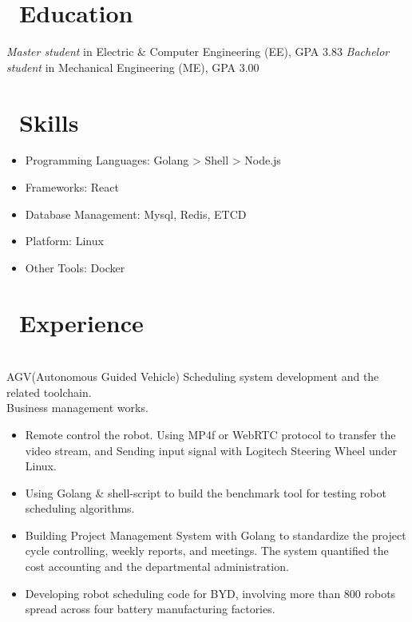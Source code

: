 \documentclass{resume}
\begin{document}



\section{\faGraduationCap\ Education}
\textit{Master student} in Electric \& Computer Engineering (EE), GPA 3.83
\textit{Bachelor student} in Mechanical Engineering (ME), GPA 3.00

\section{\faCogs\ Skills}
\begin{itemize}[parsep=0.5ex]
  \item Programming Languages: Golang > Shell > Node.js
  \item Frameworks: React
  \item Database Management: Mysql, Redis, ETCD
  \item Platform: Linux
  \item Other Tools: Docker
\end{itemize}

\section{\faUsers\ Experience}
\role{Software engineer}
\\AGV(Autonomous Guided Vehicle) Scheduling system development and the related toolchain.
\\Business management works.
\begin{itemize}
  \item Remote control the robot. Using MP4f or WebRTC protocol to transfer the video stream, and Sending input signal with Logitech Steering Wheel under Linux.
  \item Using Golang \& shell-script to build the benchmark tool for testing robot scheduling algorithms.
  \item Building Project Management System with Golang to standardize the project cycle controlling, weekly reports, and meetings. The system quantified the cost accounting and the departmental administration.
  \item Developing robot scheduling code for BYD, involving more than 800 robots spread across four battery manufacturing factories.
\end{itemize}
\end{document}
